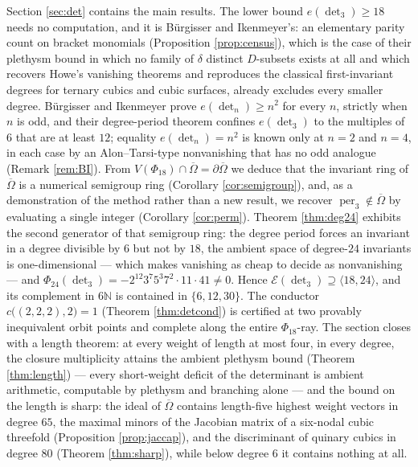 \documentclass[11pt,reqno]{amsart}
\theoremstyle{plain}
\theoremstyle{definition}
\DeclareMathOperator{\per}{per}
\newcommand{\cO}{\overline{\Omega}}
\newcommand{\bN}{\mathbb{N}}
\begin{document}
Section \ref{sec:det} contains the main results.  The lower bound
$e(\det_3)\ge18$ needs no computation, and it is B\"urgisser and Ikenmeyer's:
an elementary parity count on bracket monomials (Proposition
\ref{prop:census}), which is the case of their plethysm bound
\cite[Cor.~7.2]{BI} in which no family of $\delta$ distinct $D$-subsets exists at all and which
recovers Howe's vanishing theorems and reproduces the classical
first-invariant degrees for ternary cubics and cubic surfaces, already
excludes every smaller degree.
B\"urgisser and Ikenmeyer prove $e(\det_n)\ge n^{2}$ for every $n$, strictly
when $n$ is odd, and their degree-period theorem confines $e(\det_3)$ to the
multiples of $6$ that are at least $12$; equality $e(\det_n)=n^{2}$ is known
only at $n=2$ and $n=4$, in each case by an Alon--Tarsi-type nonvanishing that
has no odd analogue (Remark \ref{rem:BI}).  From
$V(\Phi_{18})\cap\cO=\partial\cO$ we deduce that the invariant ring of $\cO$
is a numerical semigroup ring (Corollary \ref{cor:semigroup}), and, as a
demonstration of the method rather than a new result, we recover
$\per_3\notin\cO$ by evaluating a single integer (Corollary \ref{cor:perm}).
Theorem \ref{thm:deg24} exhibits the second generator of that semigroup ring:
the degree period forces an invariant in a degree divisible by $6$ but not by
$18$, the ambient space of degree-$24$ invariants is one-dimensional --- which
makes vanishing as cheap to decide as nonvanishing --- and
$\Phi_{24}(\det_3)=-2^{12}3^{7}5^{3}7^{2}\cdot11\cdot41\neq0$.  Hence
$\mathcal E(\det_3)\supseteq\langle 18,24\rangle$, and its complement in
$6\bN$ is contained in $\{6,12,30\}$.  The conductor
$c\big((2,2,2),2\big)=1$ (Theorem \ref{thm:detcond}) is certified at two
provably inequivalent orbit points and complete along the entire
$\Phi_{18}$-ray.  The section closes with a length theorem: at every weight of
length at most four, in every degree, the closure multiplicity attains the
ambient plethysm bound (Theorem \ref{thm:length}) --- every short-weight
deficit of the determinant is ambient arithmetic, computable by plethysm and
branching alone --- and the bound on the length is sharp: the ideal of $\cO$
contains length-five highest weight vectors in degree $65$, the maximal minors
of the Jacobian matrix of a six-nodal cubic threefold (Proposition
\ref{prop:jaccap}), and the discriminant of quinary cubics in degree $80$
(Theorem \ref{thm:sharp}), while below degree $6$ it contains nothing at all.
\end{document}
